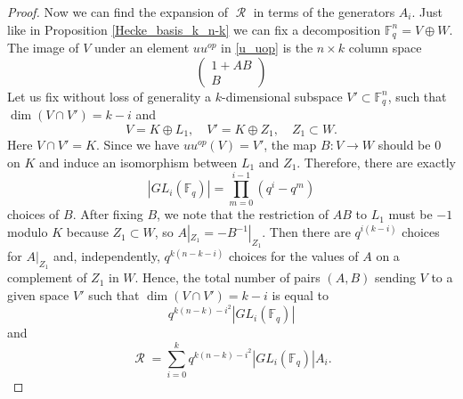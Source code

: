 \documentclass[12pt,reqno]{amsart}
\theoremstyle{definition}
\theoremstyle{remark}
\numberwithin{equation}{section}
\newcommand{\GL}[1]{GL_{#1}(\mathbb{F}_q)}
\DeclareMathOperator{\R}{\mathcal{R}}
\begin{document}
\begin{proof}
    Now we can find the expansion of $\R$ in terms of the generators $A_i$. Just like in Proposition \ref{Hecke_basis_k_n-k} we can fix a decomposition $\mathbb{F}_q^n=V\oplus W$. The image of $V$ under an element $uu^{op}$ in \eqref{u_uop} is the $n\times k$ column space
    \[
    \begin{pmatrix}
        1+AB\\
        B
    \end{pmatrix}
    \]
    Let us fix without loss of generality a $k$-dimensional subspace $V'\subset\mathbb{F}_q^n$, such that $\dim(V\cap V')=k-i$ and 
    \[
    V=K\oplus L_1, \quad V' = K \oplus Z_1, \quad Z_1 \subset W.
    \]
    Here $V\cap V'=K$. Since we have $uu^{op}(V)=V'$, the map $B:V\rightarrow W$ should be $0$ on $K$ and induce an isomorphism between $L_1$ and $Z_1$. Therefore, there are exactly
    \[
    |\GL{i}|=\prod_{m=0}^{i-1}(q^i-q^m)
    \]
    choices of $B$. After fixing $B$, we note that the restriction of $AB$ to $L_1$ must be $-1$ modulo $K$ because $Z_1\subset W$, so $A|_{Z_1}=-B^{-1}|_{Z_1}$. Then there are $q^{i(k-i)}$ choices for $A|_{Z_1}$ and, independently, $q^{k(n-k-i)}$ choices for the values of $A$ on a complement of $Z_1$ in $W$. Hence, the total number of pairs $(A,B)$ sending $V$ to a given space $V'$ such that $\dim(V\cap V')=k-i$ is equal to
    \[
    q^{k(n-k)-i^2}|\GL{i}|
    \]
    and
    \begin{equation}\label{BM_expression_for_Radon}
        \R = \sum_{i=0}^k q^{k(n-k)-i^2}|\GL{i}| A_i.
    \end{equation}


\end{proof}
\end{document}
